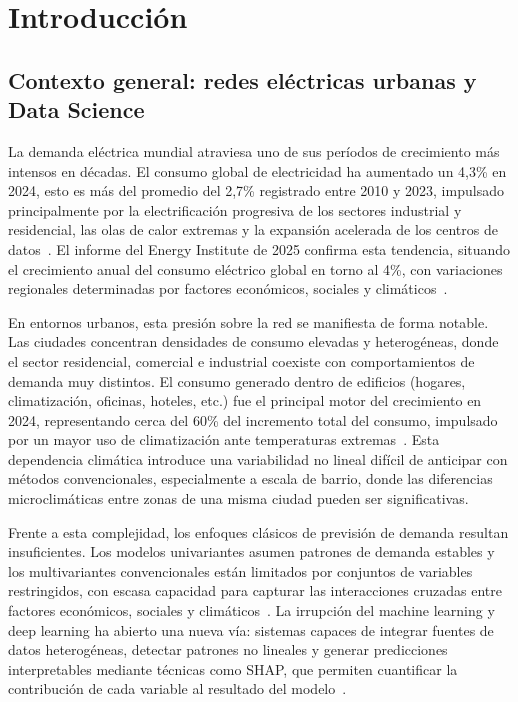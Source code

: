 \documentclass[12pt, a4paper]{article}
\begin{document}
\section{Introducción}


\subsection{Contexto general: redes eléctricas urbanas y Data Science}


La demanda eléctrica mundial atraviesa uno de sus períodos de crecimiento más intensos en décadas. El consumo global de electricidad ha aumentado un 4,3\% en 2024, esto es más del promedio del 2,7\% registrado entre 2010 y 2023, impulsado principalmente por la electrificación progresiva de los sectores industrial y residencial, las olas de calor extremas y la expansión acelerada de los centros de datos~\cite{iea2025}. El informe del Energy Institute de 2025 confirma esta tendencia, situando el crecimiento anual del consumo eléctrico global en torno al 4\%, con variaciones regionales determinadas por factores económicos, sociales y climáticos~\cite{eldakhakhni2026}.

En entornos urbanos, esta presión sobre la red se manifiesta de forma notable. Las ciudades concentran densidades de consumo elevadas y heterogéneas, donde el sector residencial, comercial e industrial coexiste con comportamientos de demanda muy distintos. El consumo generado dentro de edificios (hogares, climatización, oficinas, hoteles, etc.) fue el principal motor del crecimiento en 2024, representando cerca del 60\% del incremento total del consumo, impulsado por un mayor uso de climatización ante temperaturas extremas~\cite{iea2025}. Esta dependencia climática introduce una variabilidad no lineal difícil de anticipar con métodos convencionales, especialmente a escala de barrio, donde las diferencias microclimáticas entre zonas de una misma ciudad pueden ser significativas.

Frente a esta complejidad, los enfoques clásicos de previsión de demanda resultan insuficientes. Los modelos univariantes asumen patrones de demanda estables y los multivariantes convencionales están limitados por conjuntos de variables restringidos, con escasa capacidad para capturar las interacciones cruzadas entre factores económicos, sociales y climáticos~\cite{eldakhakhni2026}. La irrupción del machine learning y deep learning ha abierto una nueva vía: sistemas capaces de integrar fuentes de datos heterogéneas, detectar patrones no lineales y generar predicciones interpretables mediante técnicas como SHAP, que permiten cuantificar la contribución de cada variable al resultado del modelo~\cite{eldakhakhni2026}.
\end{document}
